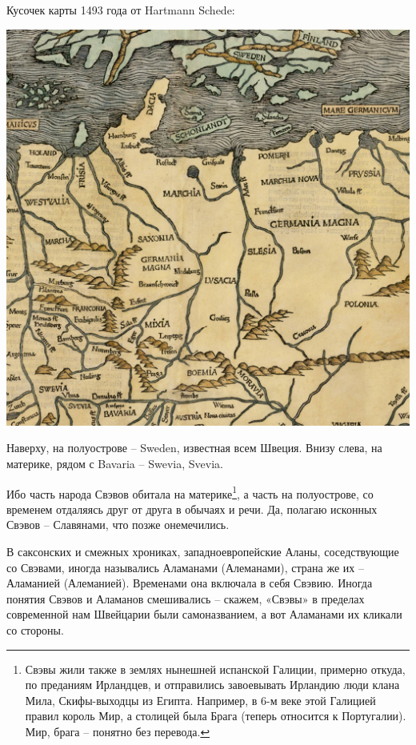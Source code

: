 Кусочек карты 1493 года от Hartmann Schede:

\begin{center}
\includegraphics[width=\linewidth]{chast-colebanie-osnov/polane/svevi02.jpg}
\end{center} 

Наверху, на полуострове – Sweden, известная всем Швеция. Внизу слева, на материке, рядом с Bavaria – Swevia, Svevia.

Ибо часть народа Свэвов обитала на материке\footnote{Свэвы жили также в землях нынешней испанской Галиции, примерно откуда, по преданиям Ирландцев, и отправились завоевывать Ирландию люди клана Мила, Скифы-выходцы из Египта. Например, в 6-м веке этой Галицией правил король Мир, а столицей была Брага (теперь относится к Португалии). Мир, брага – понятно без перевода.}, а часть на полуострове, со временем отдаляясь друг от друга в обычаях и речи. Да, полагаю исконных Свэвов – Славянами, что позже онемечились.

В саксонских и смежных хрониках, западноевропейские Аланы, соседствующие со Свэвами, иногда назывались Аламанами (Алеманами), страна же их – Аламанией (Алеманией). Временами она включала в себя Свэвию. Иногда понятия Свэвов и Аламанов смешивались – скажем, «Свэвы» в пределах современной нам Швейцарии были самоназванием, а вот Аламанами их кликали со стороны. 

